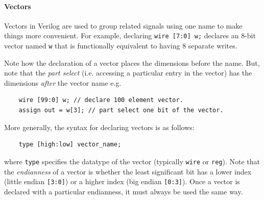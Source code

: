 \documentclass[10pt,a4paper]{article}
\begin{document}
\paragraph*{Vectors} Vectors in Verilog are used to group related signals using one name to make things more convenient. For example, declaring \verb|wire [7:0] w;| declares an 8-bit vector named \verb|w| that is functionally equivalent to having 8 separate writes.

Note how the declaration of a vector places the dimensions before the name. But, note that the \textit{part select} (i.e. accessing a particular entry in the vector) has the dimensions \textit{after} the vector name e.g.
\begin{verbatim}
    wire [99:0] w; // declare 100 element vector.
    assign out = w[3]; // part select one bit of the vector.
\end{verbatim}
More generally, the syntax for declaring vectors is as follows:
\begin{verbatim}
    type [high:low] vector_name;
\end{verbatim}
where \verb|type| specifies the datatype of the vector (typically \verb|wire| or \verb|reg|). Note that the \textit{endianness} of a vector is whether the least significant bit has a lower index (little endian \verb|[3:0]|) or a higher index (big endian \verb|[0:3]|). Once a vector is declared with a particular endianness, it must always be used the same way.



\end{document}
